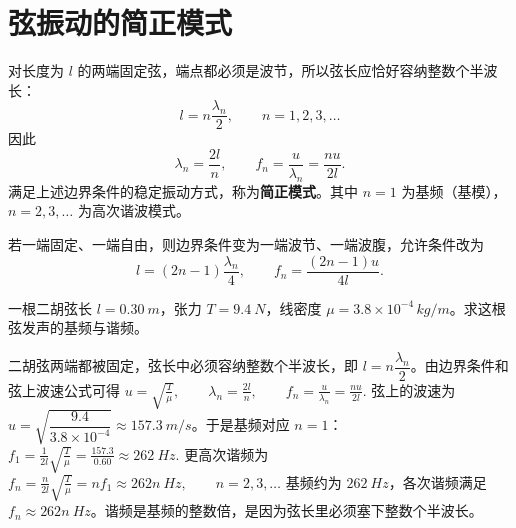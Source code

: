 
\section{弦振动的简正模式}

\begin{definition}[简正模式]
对长度为 \(l\) 的两端固定弦，端点都必须是波节，所以弦长应恰好容纳整数个半波长：
\[
l=n\frac{\lambda_n}{2},\qquad n=1,2,3,\dots
\]
因此
\[
\lambda_n=\frac{2l}{n},\qquad f_n=\frac{u}{\lambda_n}=\frac{nu}{2l}.
\]
满足上述边界条件的稳定振动方式，称为\textbf{简正模式}。其中 \(n=1\) 为基频（基模），\(n=2,3,\dots\) 为高次谐波模式。

若一端固定、一端自由，则边界条件变为一端波节、一端波腹，允许条件改为
\[
l=(2n-1)\frac{\lambda_n}{4},\qquad f_n=\frac{(2n-1)u}{4l}.
\]
\end{definition}

\begin{exercise}[二胡弦的基频和谐频怎样由边界条件决定]
一根二胡弦长 \(l=\SI{0.30}{m}\)，张力 \(T=\SI{9.4}{N}\)，线密度 \(\mu=3.8\times10^{-4}\,\si{kg/m}\)。求这根弦发声的基频与谐频。
\end{exercise}

\begin{solution}
二胡弦两端都被固定，弦长中必须容纳整数个半波长，即 \(l=n\dfrac{\lambda_n}{2}\)。由边界条件和弦上波速公式可得
 \(u=\sqrt{\frac{T}{\mu}},\qquad \lambda_n=\frac{2l}{n},\qquad f_n=\frac{u}{\lambda_n}=\frac{nu}{2l}.\) 弦上的波速为 \(u=\sqrt{\dfrac{9.4}{3.8\times10^{-4}}}\approx \SI{157.3}{m/s}\)。于是基频对应 \(n=1\)：
 \(f_1=\frac{1}{2l}\sqrt{\frac{T}{\mu}} =\frac{157.3}{0.60} \approx \SI{262}{Hz}.\) 
更高次谐频为
 \(f_n=\frac{n}{2l}\sqrt{\frac{T}{\mu}} =n f_1 \approx 262n\ \si{Hz},\qquad n=2,3,\dots\) 
基频约为 \(\SI{262}{Hz}\)，各次谐频满足 \(f_n\approx 262n\ \si{Hz}\)。谐频是基频的整数倍，是因为弦长里必须塞下整数个半波长。
\end{solution}
